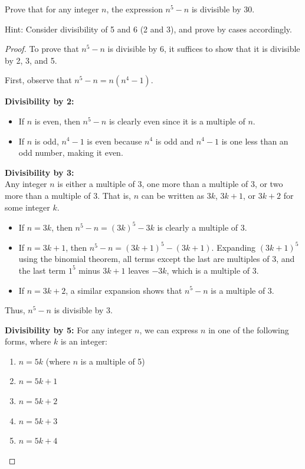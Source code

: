 \documentclass[
	12pt, %
	fleqn, %
	a4paper, %
]{LegrandOrangeBook}
\begin{document}
\begin{exercise}

Prove that for any integer \( n \), the expression \( n^5 - n \) is divisible by 30.

\end{exercise}
Hint: Consider divisibility of 5 and 6 (2 and 3), and prove by cases accordingly. 
\begin{proof}
To prove that \( n^5 - n \) is divisible by 6, it suffices to show that it is divisible by 2, 3, and 5.

First, observe that \( n^5 - n = n(n^4 - 1) \).

\textbf{Divisibility by 2:} 
\begin{itemize}
  \item If \( n \) is even, then \( n^5 - n \) is clearly even since it is a multiple of \( n \).
  \item If \( n \) is odd, \( n^4 - 1 \) is even because \( n^4 \) is odd and \( n^4 - 1 \) is one less than an odd number, making it even.
\end{itemize}

\textbf{Divisibility by 3:} \\ 
Any integer \( n \) is either a multiple of 3, one more than a multiple of 3, or two more than a multiple of 3. That is, \( n \) can be written as \( 3k \), \( 3k + 1 \), or \( 3k + 2 \) for some integer \( k \).

\begin{itemize}
    \item If \( n = 3k \), then \( n^5 - n = (3k)^5 - 3k \) is clearly a multiple of 3.
    \item If \( n = 3k + 1 \), then \( n^5 - n = (3k + 1)^5 - (3k + 1) \). Expanding \( (3k + 1)^5 \) using the binomial theorem, all terms except the last are multiples of 3, and the last term \( 1^5 \) minus \( 3k + 1 \) leaves \( -3k \), which is a multiple of 3.
    \item If \( n = 3k + 2 \), a similar expansion shows that \( n^5 - n \) is a multiple of 3.
\end{itemize}

Thus, \( n^5 - n \) is divisible by 3.

\textbf{Divisibility by 5:} 
For any integer \( n \), we can express \( n \) in one of the following forms, where \( k \) is an integer:
\begin{enumerate}
    \item \( n = 5k \) (where \( n \) is a multiple of 5)
    \item \( n = 5k + 1 \)
    \item \( n = 5k + 2 \)
    \item \( n = 5k + 3 \)
    \item \( n = 5k + 4 \)
\end{enumerate}


\end{proof}
\end{document}
